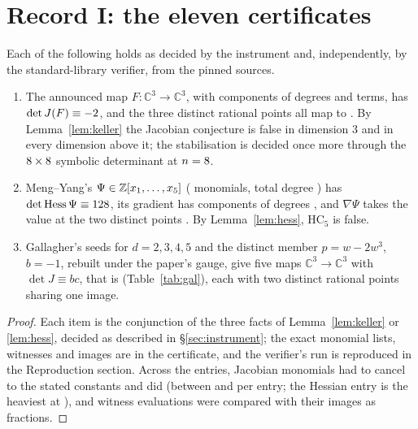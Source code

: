 \documentclass[11pt]{article}
\newcommand{\C}{\mathbb{C}}
\newcommand{\Hess}{\operatorname{Hess}}
\begin{document}
\section{Record I: the eleven certificates}\label{sec:cert}

\begin{theorem}\label{thm:published}
Each of the following holds as decided by the instrument and, independently, by the
standard-library verifier, from the pinned sources.
\begin{enumerate}
\item The announced map $F\colon\C^3\to\C^3$, with components of degrees \AlpogeDegs{} and
\AlpogeTerms{} terms, has $\det J(F)\equiv-2$, and the three distinct rational points
\AlpogePoints{} all map to \AlpogeImage. By Lemma~\ref{lem:keller} the Jacobian conjecture is
false in dimension $3$ and in every dimension above it; the stabilisation is decided once more
through the $8\times8$ symbolic determinant at $n=8$.
\item Meng--Yang's $\Psi\in\mathbb{Z}[x_1,\dots,x_5]$ (\PsiMonomials{} monomials, total degree
\PsiDegree) has $\det\Hess\Psi\equiv\HessDet$, its gradient has components of degrees
\HessGradDegs, and $\nabla\Psi$ takes the value \HessImage{} at the two distinct points
\HessPoints. By Lemma~\ref{lem:hess}, $\mathrm{HC}_5$ is false.
\item Gallagher's seeds for $d=2,3,4,5$ and the distinct member $p=w-2w^3$, $b=-1$, rebuilt
under the paper's gauge, give five maps $\C^3\to\C^3$ with $\det J\equiv bc$, that is
\GalDets{} (Table~\ref{tab:gal}), each with two distinct rational points sharing one image.
\end{enumerate}
\end{theorem}

\begin{proof}
Each item is the conjunction of the three facts of Lemma~\ref{lem:keller} or
\ref{lem:hess}, decided as described in \S\ref{sec:instrument}; the exact monomial lists, witnesses
and images are in the certificate, and the verifier's run is reproduced in the Reproduction
section. Across the \NCerts{} entries, \TotalJacMonos{} Jacobian monomials had to cancel to the
stated constants and did (between \MinJacMonos{} and \MaxJacMonos{} per entry; the Hessian
entry is the heaviest at \HessJacMonos), and \TotalWitnessEvals{} witness evaluations were
compared with their images as fractions.
\end{proof}
\end{document}

